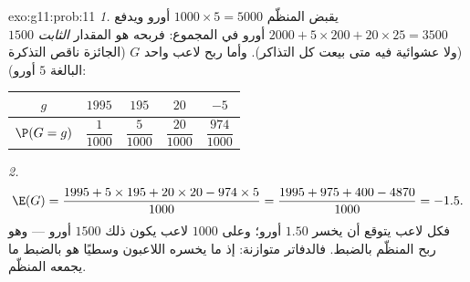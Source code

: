 \begin{solution}{exo:g11:prob:11}
\emph{1.} يقبض المنظّم $1000 \times 5 = 5000$ أورو ويدفع
$2000 + 5 \times 200 + 20 \times 25 = 3500$ أورو في المجموع: فربحه
هو المقدار \emph{الثابت} $1500$ (ولا عشوائية فيه متى بيعت كل التذاكر).
وأما ربح لاعب واحد $G$ (الجائزة ناقص التذكرة البالغة $5$ أورو):
\begin{center}
\begin{tabular}{c|cccc}
$g$ & $1995$ & $195$ & $20$ & $-5$\\
\hline\rule{0pt}{11pt}%
$\P(G=g)$ & $\dfrac{1}{1000}$ & $\dfrac{5}{1000}$ & $\dfrac{20}{1000}$
& $\dfrac{974}{1000}$
\end{tabular}
\end{center}

\emph{2.}
\[
\E(G) = \frac{1995 + 5 \times 195 + 20 \times 20 - 974 \times 5}{1000}
= \frac{1995 + 975 + 400 - 4870}{1000} = -1.5 .
\]
فكل لاعب يتوقع أن يخسر $1.50$ أورو؛ وعلى $1000$ لاعب يكون ذلك
$1500$ أورو --- وهو ربح المنظّم بالضبط. فالدفاتر متوازنة:
إذ ما يخسره اللاعبون وسطيًا هو بالضبط ما يجمعه المنظّم.
\end{solution}

